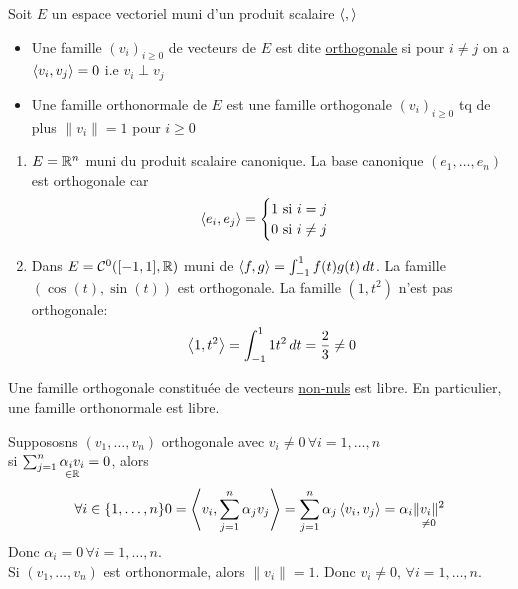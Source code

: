 \begin{definition}
    Soit $E$ un espace vectoriel muni d'un produit scalaire  $\left\langle , \right\rangle$
     \begin{itemize}
         \item Une famille $(v_i)_{i \ge 0}$ de vecteurs de $E$ est dite \underline{orthogonale} si pour $i \neq j$ on a $\left\langle v_i, v_j \right\rangle = 0$ i.e  $v_i \perp v_j$
         \item Une famille orthonormale de  $E$ est une famille orthogonale  $(v_i)_{i \ge  0}$ tq de plus $\|v_i\| = 1$ pour  $i \ge 0$
    \end{itemize}
\end{definition}
\begin{eg}
   \begin{enumerate}
       \item $E = \mathbb{R}^{n}$ muni du produit scalaire canonique. La base canonique $(e_1, \ldots, e_n)$ est orthogonale car 
           \[
           \left\langle e_i, e_j \right\rangle = \begin{cases}
               1 \text{ si } i = j\\
               0 \text{ si } i \neq j
           \end{cases}
           \] 
       \item Dans $E = \mathcal{C}^{0}([-1, 1], \mathbb{R})$ muni de $\left\langle f,g \right\rangle = \int_{-1}^{1} f(t)g(t)\,d{t}$. La famille $(\cos(t), \sin(t))$ est orthogonale. La famille $(1, t^2)$ n'est pas orthogonale:
            \[
                \left\langle 1, t^2 \right\rangle = \int_{-1}^{1} 1 t^2 \, d{t} = \frac{2}{3} \neq  0 
           \] 
   \end{enumerate} 
\end{eg}
\begin{prop}
    Une famille orthogonale constituée de vecteurs \underline{non-nuls} est libre. En particulier, une famille orthonormale est libre. 
\end{prop}
\begin{preuve}
    Suppososns $(v_1, \ldots, v_n)$ orthogonale avec $v_i \neq 0 \, \forall i = 1, \ldots, n$\\
    si $\sum_{j=1}^{n} \underset{\in \mathbb{R}}{\alpha_iv_i} = 0$, alors  
    \[
        \forall i \in \{1, \ldots, n\} 0 = \left\langle v_i, \sum_{j=1}^{n} \alpha_jv_j \right\rangle = \sum_{j=1}^{n}\alpha_j \left\langle v_i, v_j \right\rangle = \alpha_i \underset{\neq 0}{\|v_i\|^2}
    \] 
    Donc $\alpha_i = 0 \, \forall i = 1, \ldots, n$.\\
    Si $(v_1, \ldots, v_n)$ est orthonormale, alors $\|v_i\| = 1$. Donc  $v_i \neq 0, \, \forall i = 1, \ldots, n$.
\end{preuve}
